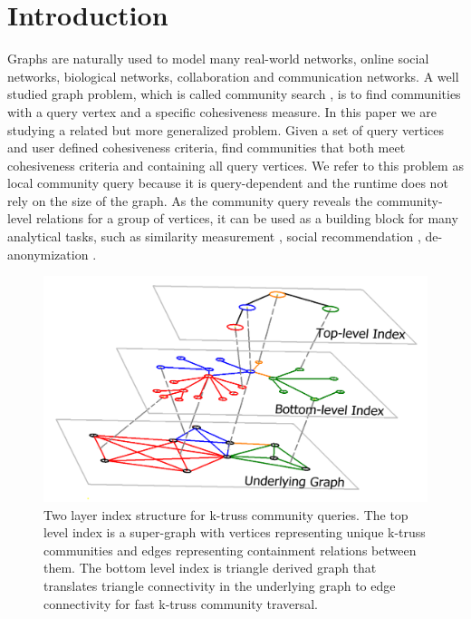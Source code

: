 \section{Introduction}
\label{introduction}

Graphs are naturally used to model many real-world networks, \eg online social networks, biological networks, collaboration and communication networks. A well studied graph problem, which is called community search \cite{huang2014querying, akbas2017truss, huang2015approximate, lee2016query, sozio2010community, cui2014local, li2015influential, barbieri2015efficient}, is to find communities with a query vertex and a specific cohesiveness measure. In this paper we are studying a related but more generalized problem. Given a set of query vertices and user defined cohesiveness criteria, find communities that both meet cohesiveness criteria and containing all query vertices. We refer to this problem as local community query because it is query-dependent and the runtime does not rely on the size of the graph. As the community query reveals the community-level relations for a group of vertices, it can be used as a building block for many analytical tasks, such as similarity measurement \cite{tsitsulin2018verse}, 
social recommendation \cite{liu2018connect}, de-anonymization \cite{wu2018social}.

\begin{figure}[ht]
    \centering
    \includegraphics[width=0.9\linewidth]{./figures/illustration_main.png}
    \caption{Two layer index structure for k-truss community queries. The top level index is a super-graph with vertices representing unique k-truss communities and edges representing containment relations between them. The bottom level index is triangle derived graph that translates triangle connectivity in the underlying graph to edge connectivity for fast k-truss community traversal.}
    \label{fig:illustration_main}
\end{figure}

